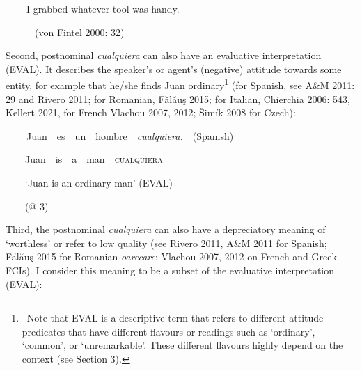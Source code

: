 \begin{styleStandard}
\textbf{\ \ }\ \ I grabbed whatever tool was handy. \ \ 
\end{styleStandard}

\begin{styleStandard}
\ \ \ \ \ \ (von Fintel 2000: 32)
\end{styleStandard}

\begin{styleStandard}
Second, postnominal \textit{cualquiera} can also have an evaluative interpretation (EVAL). It describes the speaker’s or agent’s (negative) attitude towards some entity, for example that he/she finds Juan ordinary\footnote{\ \textrm{Note that EVAL is a descriptive term that refers to different attitude predicates that have different flavours or readings such as ‘ordinary’, ‘common’, or ‘unremarkable’. These different flavours highly depend on the context (see Section 3).}} (for Spanish, see A\&M 2011: 29 and Rivero 2011; for Romanian, Fălăuş 2015; for Italian, Chierchia 2006: 543, Kellert 2021, for French Vlachou 2007, 2012; Šimík 2008 for Czech):\textstyleFootnoteSymbol{ }
\end{styleStandard}

\clearpage\begin{styleStandard}
\textbf{\ \ }\ \ Juan\ \ es\ \ un\ \ hombre\ \ \textit{cualquiera.}\ \ (Spanish)
\end{styleStandard}

\begin{styleStandard}
\ \ \ \ Juan\ \ is\ \ a\ \ man\ \ \textsc{cualquiera}\ \ 
\end{styleStandard}

\begin{styleStandard}
\ \ \ \ ‘Juan is an ordinary man’ (EVAL)
\end{styleStandard}

\begin{styleStandard}
\ \ \ \ (@ 3)
\end{styleStandard}

\begin{styleStandard}
Third, the postnominal \textit{cualquiera} can also have a depreciatory meaning of ‘worthless’ or refer to low quality (see Rivero 2011, A\&M 2011 for Spanish; Fălăuş 2015 for Romanian \textit{oarecare}; Vlachou 2007, 2012 on French and Greek FCIs). I consider this meaning to be a subset of the evaluative interpretation (EVAL):
\end{styleStandard}

